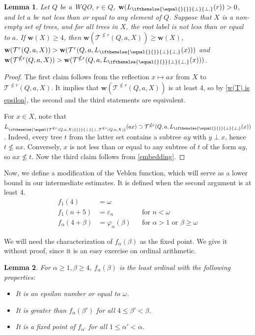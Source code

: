 \documentclass[10pt,a4paper]{amsart}
\let \leq \leqslant
\let \nleq \nleqslant
\let \geq \geqslant
\let \phi \varphi
\let \epsilon \varepsilon
\newcommand \K [2][]{L_{\ifthenelse{\equal{#1}{}}{\bot}{\bot,#1}}(#2)}
\renewcommand \k [2][]{\w(\K[#1]{#2})}
\def \T {\mathcal{T}}
\def \w {\textbf{w}}
\newtheorem{lemma}{Lemma}
\begin{document}
\begin{lemma}\label{w(T) is monotone by X}
    Let $Q$ be a WQO, $r \in Q$, $\k{r} > 0$, and let $a$ be not less than or equal to any element of $Q$.
    Suppose that $X$ is a non-empty set of trees, and for all trees in $X$, the root label is not less than or equal to $a$.
    If $\w(X) \geq 4$, then $\w(\T^{\nleq r}(Q, a, X)) \geq \w(X)$, $\w(\T^r(Q, a, X)) > \w(\T^r(Q, a, \K{x}))$ and $\w(\T^{\nleq r}(Q, a, X)) > \w(\T^{\nleq r}(Q, a, \K{x}))$.
\end{lemma}
\begin{proof}
    The first claim follows from the reflection $x \mapsto ax$ from $X$ to $\T^{\nleq r}(Q, a, X)$.
    It implies that $\w(\T^{\nleq r}(Q, a, X))$ is at least 4, so by \cref{w(T) is epsilon}, the second and the third statements are equivalent.
    
    For $x \in X$, note that $\K[\T^{\nleq r}(Q, a, X)]{a x} \supset \T^{\nleq r}(Q, a, \K{x})$. Indeed, every tree $t$ from the latter set contains a subtree $a y$ with $y \perp x$, hence $t \nleq a x$. Conversely, $x$ is not less than or equal to any subtree of $t$ of the form $a y$, so $a x \nleq t$. Now the third claim follows from \cref{embedding}.
\end{proof}

Now, we define a modification of the Veblen function, which will serve as a lower bound in our intermediate estimates. It is defined when the second argument is at least 4.
\begin{align*}
    f_1(4) &= \omega\\
    f_1(n+5) &= \epsilon_n &&\text{for } n < \omega\\
    f_\alpha(4+\beta) &= \phi_\alpha(\beta) &&\text{for } \alpha > 1 \text{ or } \beta \geq \omega
\end{align*}

We will need the characterization of $f_\alpha(\beta)$ as the fixed point. We give it without proof, since it is an easy exercise on ordinal arithmetic.

\begin{lemma}\label{f def}
    For $\alpha \geq 1, \beta \geq 4$, $f_\alpha(\beta)$ is the least ordinal with the following properties:
    \begin{itemize}
        \item It is an epsilon number or equal to $\omega$.
        \item It is greater than $f_\alpha(\beta')$ for all $4 \leq \beta' < \beta$.
        \item It is a fixed point of $f_{\alpha'}$ for all $1 \leq \alpha' < \alpha$.
    \end{itemize}
\end{lemma}
\end{document}
